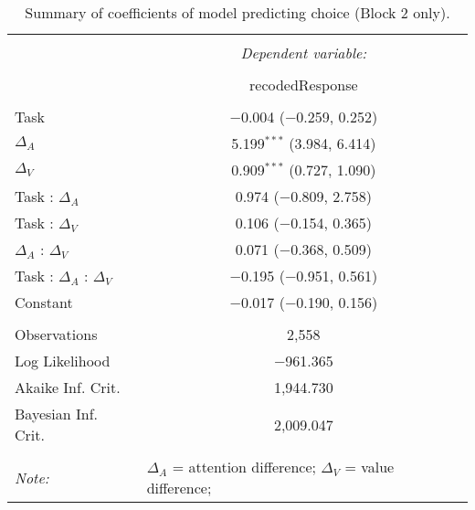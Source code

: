
\begin{table}[!b] \centering 
  \caption{Summary of coefficients of model predicting choice (Block 2 only).} 
  \label{table:choiceModelBlock2} 
\begin{tabular}{@{\extracolsep{5pt}}lc} 
\\[-1.8ex]\hline 
\hline \\[-1.8ex] 
 & \multicolumn{1}{c}{\textit{Dependent variable:}} \\ 
\cline{2-2} 
\\[-1.8ex] & recodedResponse \\ 
\hline \\[-1.8ex] 
 Task & $-$0.004 ($-$0.259, 0.252) \\ 
  $\Delta_A$ & 5.199$^{***}$ (3.984, 6.414) \\ 
  $\Delta_V$ & 0.909$^{***}$ (0.727, 1.090) \\ 
  Task : $\Delta_A$ & 0.974 ($-$0.809, 2.758) \\ 
  Task : $\Delta_V$ & 0.106 ($-$0.154, 0.365) \\ 
  $\Delta_A$ : $\Delta_V$ & 0.071 ($-$0.368, 0.509) \\ 
  Task : $\Delta_A$ :  $\Delta_V$ & $-$0.195 ($-$0.951, 0.561) \\ 
  Constant & $-$0.017 ($-$0.190, 0.156) \\ 
 \hline \\[-1.8ex] 
Observations & 2,558 \\ 
Log Likelihood & $-$961.365 \\ 
Akaike Inf. Crit. & 1,944.730 \\ 
Bayesian Inf. Crit. & 2,009.047 \\ 
\hline 
\hline \\[-1.8ex] 
\textit{Note:}  & \multicolumn{1}{l}{\footnotesize $\Delta_A$ = attention difference; $\Delta_V$ = value difference; } \\ 
\end{tabular} 
\end{table} 

